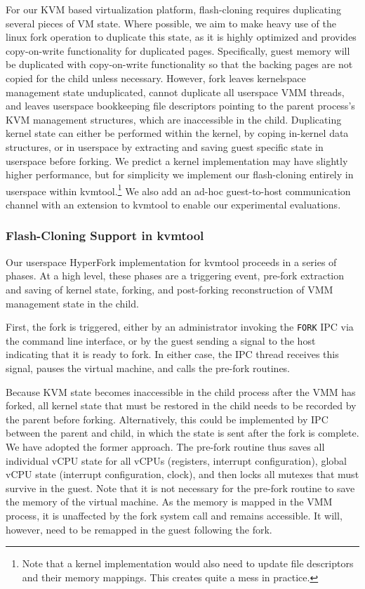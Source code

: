 For our KVM based virtualization platform, flash-cloning requires duplicating
several pieces of VM state. Where possible, we aim to make heavy use of the
linux fork operation to duplicate this state, as it is highly optimized and
provides copy-on-write functionality for duplicated pages. Specifically, guest
memory will be duplicated with copy-on-write functionality so that the backing
pages are not copied for the child unless necessary. However, fork leaves
kernelspace management state unduplicated, cannot duplicate all userspace VMM
threads, and leaves userspace bookkeeping file descriptors pointing to the
parent process's KVM management structures, which are inaccessible in the
child. Duplicating kernel state can either be performed within the kernel, by
coping in-kernel data structures, or in userspace by extracting and saving
guest specific state in userspace before forking. We predict a kernel
implementation may have slightly higher performance, but for simplicity we
implement our flash-cloning entirely in userspace within kvmtool.\footnote{Note
that a kernel implementation would also need to update file descriptors and
their memory mappings. This creates quite a mess in practice.} We also add an
ad-hoc guest-to-host communication channel with an extension to kvmtool to
enable our experimental evaluations.

\subsubsection{Flash-Cloning Support in kvmtool}

Our userspace HyperFork implementation for kvmtool proceeds in a series of
phases. At a high level, these phases are a triggering event, pre-fork
extraction and saving of kernel state, forking, and post-forking reconstruction
of VMM management state in the child.

First, the fork is triggered, either by an administrator invoking the
\texttt{FORK} IPC via the command line interface, or by the guest sending a
signal to the host indicating that it is ready to fork. In either case, the IPC
thread receives this signal, pauses the virtual machine, and calls the pre-fork
routines.

Because KVM state becomes inaccessible in the child process after the VMM has
forked, all kernel state that must be restored in the child needs to be
recorded by the parent before forking. Alternatively, this could be implemented
by IPC between the parent and child, in which the state is sent after the fork
is complete. We have adopted the former approach. The pre-fork routine thus
saves all individual vCPU state for all vCPUs (registers, interrupt
configuration), global vCPU state (interrupt configuration, clock), and then
locks all mutexes that must survive in the guest. Note that it is not necessary
for the pre-fork routine to save the memory of the virtual machine. As the
memory is mapped in the VMM process, it is unaffected by the fork system call
and remains accessible. It will, however, need to be remapped in the guest
following the fork.

